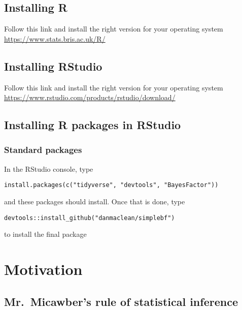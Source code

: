 \documentclass[
]{book}
\begin{document}
\hypertarget{installing-r}{%
\section{Installing R}\label{installing-r}}

Follow this link and install the right version for your operating system \url{https://www.stats.bris.ac.uk/R/}

\hypertarget{installing-rstudio}{%
\section{Installing RStudio}\label{installing-rstudio}}

Follow this link and install the right version for your operating system \url{https://www.rstudio.com/products/rstudio/download/}

\hypertarget{installing-r-packages-in-rstudio}{%
\section{Installing R packages in RStudio}\label{installing-r-packages-in-rstudio}}

\hypertarget{standard-packages}{%
\subsection{Standard packages}\label{standard-packages}}

In the RStudio console, type

\texttt{install.packages(c("tidyverse",\ "devtools",\ "BayesFactor"))}

and these packages should install. Once that is done, type

\texttt{devtools::install\_github("danmaclean/simplebf")}

to install the final package

\hypertarget{motivation}{%
\chapter{Motivation}\label{motivation}}

\hypertarget{mr.-micawbers-rule-of-statistical-inference}{%
\section{Mr.~Micawber's rule of statistical inference}\label{mr.-micawbers-rule-of-statistical-inference}}
\end{document}
